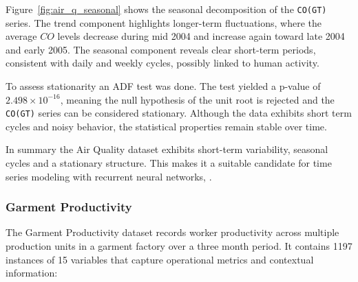 \documentclass[conference]{IEEEtran}
\begin{document}
Figure~\ref{fig:air_q_seasonal} shows the seasonal decomposition of the \texttt{CO(GT)} series. The trend component highlights longer-term fluctuations, where the average $CO$ levels decrease during mid 2004 and increase again toward late 2004 and early 2005. The seasonal component reveals clear short-term periods, consistent with daily and weekly cycles, possibly linked to human activity.

To assess stationarity an ADF test was done. The test yielded a p-value of $2.498 \times 10^{-16}$, meaning the null hypothesis of the unit root is rejected and the \texttt{CO(GT)} series can be considered stationary. Although the data exhibits short term cycles and noisy behavior, the statistical properties remain stable over time.

In summary the Air Quality dataset exhibits short-term variability, seasonal cycles and a stationary structure. This makes it a suitable candidate for time series modeling with recurrent neural networks, \cite{air_quality}.

\subsubsection{\textbf{Garment Productivity}}

The Garment Productivity dataset records worker productivity across multiple production units in a garment factory over a three month period. It contains 1197 instances of 15 variables that capture operational metrics and contextual information:
\end{document}
